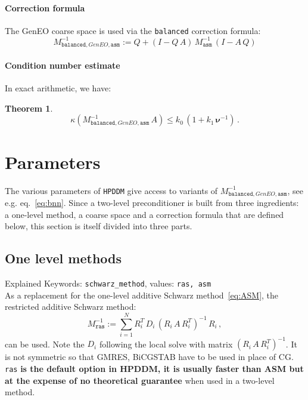 \documentclass{article}
\newtheorem{theorem}{Theorem}[section]
\begin{document}
\paragraph{Correction formula}
The GenEO coarse space is used via the \texttt{balanced} correction formula:
\begin{equation}
  \label{eq:bnnGenEO}
  \boxed{
 M_{\texttt{balanced},GenEO,\texttt{asm}}^{-1} := Q+(I-Q\,A)\,M_{\texttt{asm}}^{-1}\,(I-A\,Q)
 }
\end{equation}

\paragraph{Condition number estimate} 
In exact arithmetic, we have:
\begin{theorem}
	\label{th:geneo}
\[
 \kappa(M_{\texttt{balanced},GenEO,\texttt{asm}}^{-1}\,A) \le k_0\,(1+k_1\,\boldsymbol{\nu}^{-1})\,.
\]
\end{theorem}

\section{Parameters}
	\label{sec:parameters}
The various parameters of \texttt{HPDDM} give access to variants of $M_{\texttt{balanced},GenEO,\texttt{asm}}^{-1}$, see e.g.  eq.~\eqref{eq:bnn}. Since a two-level preconditioner is built from three ingredients: a one-level method, a coarse space and a correction formula that are defined below, this section is itself divided into three parts. 


\subsection{One level methods}
Explained Keywords: \texttt{schwarz\_method}, values: \texttt{ras, asm}\\


As a replacement for the one-level additive Schwarz method~\eqref{eq:ASM}, the restricted additive Schwarz method:
 \begin{equation}
    \label{eq:ASM}\boxed{
    M_{\texttt{ras}}^{-1} := \sum_{i=1}^N R_i^T\,D_i\,(R_i\,A\,R_i^T)^{-1}\,R_i\,,
    }
 \end{equation}
 can be used. Note the $D_i$ following the local solve with matrix $(R_i\,A\,R_i^T)^{-1}$. It is not symmetric so that GMRES, BiCGSTAB have to be used in place of CG. \texttt{ras} {\bf is the default option in HPDDM, it is usually faster than ASM but at the expense of no theoretical guarantee} when used in a two-level method.  
\end{document}
